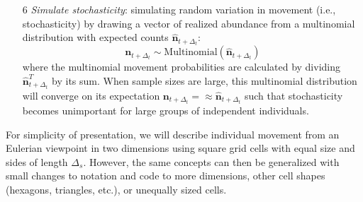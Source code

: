 \begin{enumerate}
    \item[6] \textit{Simulate stochasticity}: simulating random variation in movement (i.e., stochasticity) by drawing a vector of realized abundance from a multinomial distribution with expected counts \( \hat{\mathbf{n}}_{t+\Delta_t} \):
\begin{equation} \label{eq:Chap10_movement_stochasticity}
   \mathbf{n}_{t+\Delta_t} \sim \mathrm{Multinomial}( \hat{\mathbf{n}}_{t+\Delta_t} ) 
\end{equation}    
    where the multinomial movement probabilities are calculated by dividing \(\hat{\mathbf{n}}_{t+\Delta_t}^T\) by its sum.  When sample sizes are large, this multinomial distribution will converge on its expectation \( \mathbf{n}_{t+\Delta_t} =\approx \hat{\mathbf{n}}_{t+\Delta_t} \) such that stochasticity becomes unimportant for large groups of independent individuals.
\end{enumerate}
For simplicity of presentation, we will describe individual movement from an Eulerian viewpoint in two dimensions using square grid cells with equal size and sides of length \(\Delta_s\).  However, the same concepts can then be generalized with small changes to notation and code to more dimensions, other cell shapes (hexagons, triangles, etc.), or unequally sized cells.  

